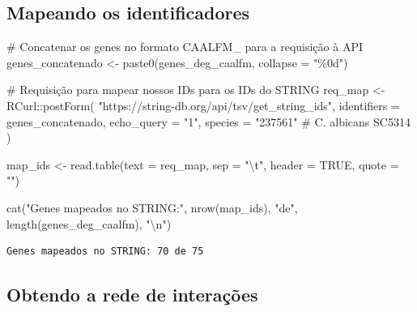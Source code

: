 \documentclass[
  letterpaper,
  DIV=11,
  numbers=noendperiod]{scrreprt}
\newenvironment{Shaded}{\begin{snugshade}}{\end{snugshade}}
\newcommand{\AttributeTok}[1]{\textcolor[rgb]{0.40,0.45,0.13}{#1}}
\newcommand{\CommentTok}[1]{\textcolor[rgb]{0.37,0.37,0.37}{#1}}
\newcommand{\ConstantTok}[1]{\textcolor[rgb]{0.56,0.35,0.01}{#1}}
\newcommand{\FunctionTok}[1]{\textcolor[rgb]{0.28,0.35,0.67}{#1}}
\newcommand{\NormalTok}[1]{\textcolor[rgb]{0.00,0.23,0.31}{#1}}
\newcommand{\OtherTok}[1]{\textcolor[rgb]{0.00,0.23,0.31}{#1}}
\newcommand{\SpecialCharTok}[1]{\textcolor[rgb]{0.37,0.37,0.37}{#1}}
\newcommand{\StringTok}[1]{\textcolor[rgb]{0.13,0.47,0.30}{#1}}
\begin{document}
\subsection{Mapeando os
identificadores}\label{mapeando-os-identificadores}

\begin{Shaded}
\begin{Highlighting}[]
\CommentTok{\# Concatenar os genes no formato CAALFM\_ para a requisição à API}
\NormalTok{genes\_concatenado }\OtherTok{\textless{}{-}} \FunctionTok{paste0}\NormalTok{(genes\_deg\_caalfm, }\AttributeTok{collapse =} \StringTok{"\%0d"}\NormalTok{)}

\CommentTok{\# Requisição para mapear nossos IDs para os IDs do STRING}
\NormalTok{req\_map }\OtherTok{\textless{}{-}}\NormalTok{ RCurl}\SpecialCharTok{::}\FunctionTok{postForm}\NormalTok{(}
  \StringTok{"https://string{-}db.org/api/tsv/get\_string\_ids"}\NormalTok{,}
  \AttributeTok{identifiers =}\NormalTok{ genes\_concatenado,}
  \AttributeTok{echo\_query =} \StringTok{"1"}\NormalTok{,}
  \AttributeTok{species =} \StringTok{"237561"}  \CommentTok{\# C. albicans SC5314}
\NormalTok{)}

\NormalTok{map\_ids }\OtherTok{\textless{}{-}} \FunctionTok{read.table}\NormalTok{(}\AttributeTok{text =}\NormalTok{ req\_map, }\AttributeTok{sep =} \StringTok{"}\SpecialCharTok{\textbackslash{}t}\StringTok{"}\NormalTok{, }\AttributeTok{header =} \ConstantTok{TRUE}\NormalTok{, }\AttributeTok{quote =} \StringTok{""}\NormalTok{)}

\FunctionTok{cat}\NormalTok{(}\StringTok{"Genes mapeados no STRING:"}\NormalTok{, }\FunctionTok{nrow}\NormalTok{(map\_ids), }\StringTok{"de"}\NormalTok{, }\FunctionTok{length}\NormalTok{(genes\_deg\_caalfm), }\StringTok{"}\SpecialCharTok{\textbackslash{}n}\StringTok{"}\NormalTok{)}
\end{Highlighting}
\end{Shaded}

\begin{verbatim}
Genes mapeados no STRING: 70 de 75 
\end{verbatim}

\subsection{Obtendo a rede de
interações}\label{obtendo-a-rede-de-interauxe7uxf5es}
\end{document}

